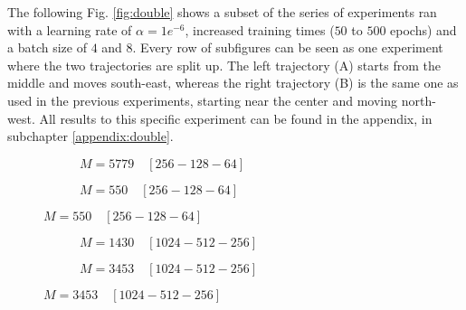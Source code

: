 \par
The following Fig. \ref{fig:double} shows a subset of the series of experiments ran with a learning rate of $\alpha=1e^{-6}$, increased training times ($50$ to $500$ epochs) and a batch size of $4$ and $8$. Every row of subfigures can be seen as one experiment where the two trajectories are split up. The left trajectory (A) starts from the middle and moves south-east, whereas the right trajectory (B) is the same one as used in the previous experiments, starting near the center and moving north-west. All results to this specific experiment can be found in the appendix, in subchapter \ref{appendix:double}.
\begin{figure}[H]
     \centering
     \begin{subfigure}[b]{0.48\textwidth}
         \centering
             
         \caption{$M=5779  \quad [256-128-64]$}
         \label{fig:double3}
     \end{subfigure}
          \hfill
               \begin{subfigure}[b]{0.48\textwidth}
         \centering
             
         \caption{$M=550 \quad [256-128-64]$}
         \label{fig:double4}
     \end{subfigure}
\end{figure}
\begin{figure}[H]\ContinuedFloat
     \begin{subfigure}[b]{0.48\textwidth}
         \centering
       
         \caption{$M=1430  \quad [1024-512-256]$}
         \label{fig:double1}
     \end{subfigure}
     \hfill
     \begin{subfigure}[b]{0.48\textwidth}
         \centering
             
         \caption{$M=3453  \quad [1024-512-256] $}
         \label{fig:double2}
     \end{subfigure}
\end{figure}
